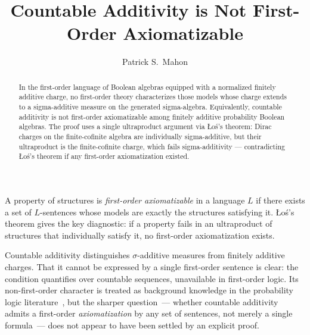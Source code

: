 \documentclass{amsproc}
\theoremstyle{definition}
\begin{document}
\title{Countable Additivity is Not First-Order Axiomatizable}

\author{Patrick S.\ Mahon}
\address{Research Computing Group, Simon Fraser University,
         Burnaby, BC, Canada}



\begin{abstract}
In the first-order language of Boolean algebras equipped with a normalized
finitely additive charge, no first-order theory characterizes those models
whose charge extends to a sigma-additive measure on the generated
sigma-algebra.  Equivalently, countable additivity is not first-order
axiomatizable among finitely additive probability Boolean algebras.  The
proof uses a single ultraproduct argument via \L{}o\'s's theorem: Dirac
charges on the finite-cofinite algebra are individually sigma-additive, but
their ultraproduct is the finite-cofinite charge, which fails
sigma-additivity --- contradicting \L{}o\'s's theorem if any first-order
axiomatization existed.
\end{abstract}

\maketitle

A property of structures is \emph{first-order axiomatizable} in a language
$L$ if there exists a set of $L$-sentences whose models are exactly the
structures satisfying it.  \L{}o\'{s}'s theorem gives the key diagnostic:
if a property fails in an ultraproduct of structures that individually
satisfy it, no first-order axiomatization exists.

Countable additivity distinguishes $\sigma$-additive measures from finitely
additive charges.  That it cannot be expressed by a single first-order
sentence is clear: the condition quantifies over countable sequences,
unavailable in first-order logic.  Its non-first-order character is treated
as background knowledge in the probability logic
literature~\cite{Hoover1978,Keisler1985,FaginHalpernMegiddo1990}, but the
sharper question~--- whether countable additivity admits a first-order
\emph{axiomatization} by any set of sentences, not merely a single
formula~--- does not appear to have been settled by an explicit proof.
\end{document}
